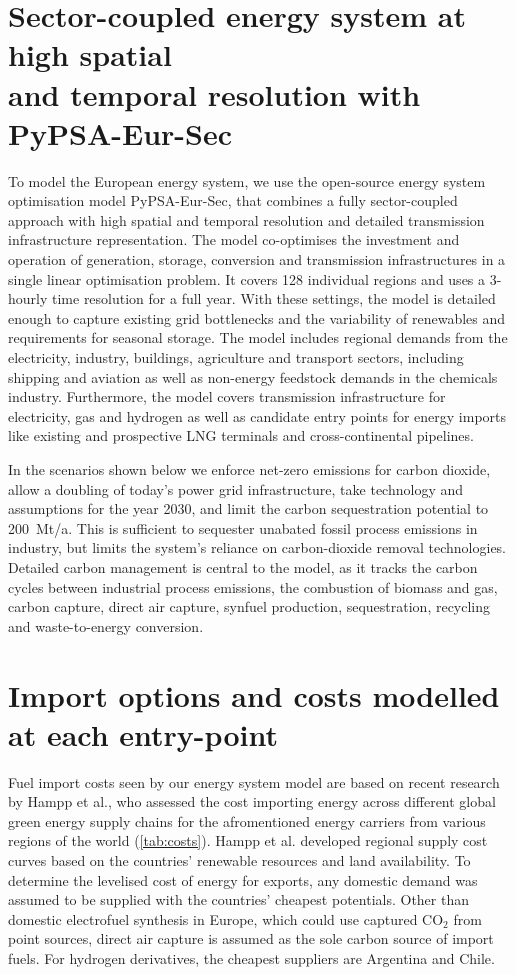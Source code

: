 \documentclass[10pt,5p,reversenotenum,lefttitle]{elsarticle}
\begin{document}
\section*{Sector-coupled energy system at high spatial\\and temporal resolution with PyPSA-Eur-Sec}

To model the European energy system, we use the open-source energy system
optimisation model PyPSA-Eur-Sec,\cite{PyPSAEurSecSectorCoupled} that combines a
fully sector-coupled approach with high spatial and temporal resolution and
detailed transmission infrastructure representation. The model co-optimises the
investment and operation of generation, storage, conversion and transmission
infrastructures in a single linear optimisation problem. It covers 128
individual regions and uses a 3-hourly time resolution for a full year. With
these settings, the model is detailed enough to capture existing grid
bottlenecks and the variability of renewables and requirements for seasonal
storage. The model includes regional demands from the electricity, industry,
buildings, agriculture and transport sectors, including shipping and aviation as
well as non-energy feedstock demands in the chemicals industry. Furthermore, the
model covers transmission infrastructure for electricity, gas and hydrogen as
well as candidate entry points for energy imports like existing and prospective
LNG terminals and cross-continental pipelines. 

In the scenarios shown below we enforce net-zero emissions for carbon dioxide,
allow a doubling of today's power grid infrastructure, take technology and
assumptions for the year 2030\cite{dea2019}, and limit the carbon sequestration
potential to 200~Mt/a. This is sufficient to sequester unabated fossil process
emissions in industry, but limits the system's reliance on carbon-dioxide
removal technologies. Detailed carbon management is central to the model, as it
tracks the carbon cycles between industrial process emissions, the combustion of
biomass and gas, carbon capture, direct air capture, synfuel production,
sequestration, recycling and waste-to-energy conversion. 

\section*{Import options and costs modelled at each entry-point}

Fuel import costs seen by our energy system model are based on recent research
by Hampp et al.\cite{hamppImportOptions2021}, who assessed the cost importing
energy across different global green energy supply chains for the afromentioned
energy carriers from various regions of the world (\cref{tab:costs}). Hampp et
al.\cite{hamppImportOptions2021} developed regional supply cost curves based on
the countries' renewable resources and land availability. To determine the
levelised cost of energy for exports, any domestic demand was assumed to be
supplied with the countries' cheapest potentials. Other than domestic
electrofuel synthesis in Europe, which could use captured CO$_2$ from point
sources, direct air capture is assumed as the sole carbon source of import
fuels. For hydrogen derivatives, the cheapest suppliers are Argentina and Chile.
\end{document}
